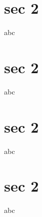 \documentclass{beamer}
\begin{document}
\section{sec 2}
\begin{frame}
abc
\end{frame}

\section{sec 2}
\begin{frame}
abc
\end{frame}

\section{sec 2}
\begin{frame}
abc
\end{frame}

\section{sec 2}
\begin{frame}
abc
\end{frame}
\end{document}
